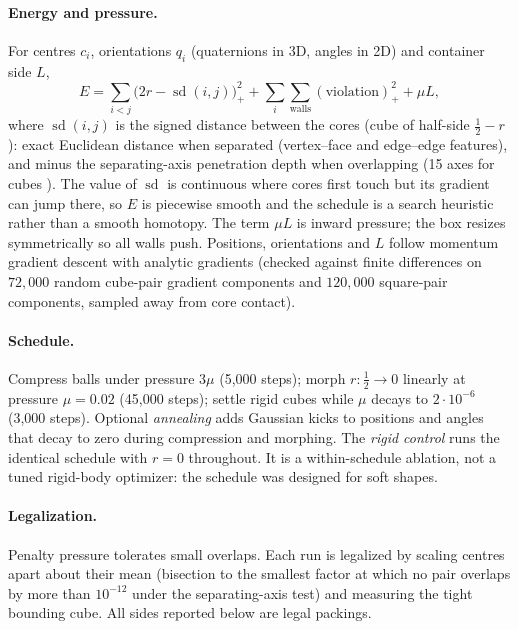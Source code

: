 \documentclass[11pt]{article}
\begin{document}
\paragraph{Energy and pressure.} For centres $c_i$, orientations $q_i$ (quaternions in 3D, angles in 2D) and container side $L$,
\[
E=\sum_{i<j}\big(2r-\operatorname{sd}(i,j)\big)_+^2+\sum_i\sum_{\text{walls}}(\text{violation})_+^2+\mu L,
\]
where $\operatorname{sd}(i,j)$ is the signed distance between the cores (cube of half-side $\tfrac12-r$): exact Euclidean distance when separated (vertex--face and edge--edge features), and minus the separating-axis penetration depth when overlapping (15 axes for cubes \cite{gottschalk}). The value of $\operatorname{sd}$ is continuous where cores first touch but its gradient can jump there, so $E$ is piecewise smooth and the schedule is a search heuristic rather than a smooth homotopy. The term $\mu L$ is inward pressure; the box resizes symmetrically so all walls push. Positions, orientations and $L$ follow momentum gradient descent with analytic gradients (checked against finite differences on $72{,}000$ random cube-pair gradient components and $120{,}000$ square-pair components, sampled away from core contact).

\paragraph{Schedule.} Compress balls under pressure $3\mu$ (5{,}000 steps); morph $r:\tfrac12\to0$ linearly at pressure $\mu=0.02$ (45{,}000 steps); settle rigid cubes while $\mu$ decays to $2\cdot10^{-6}$ (3{,}000 steps). Optional \emph{annealing} adds Gaussian kicks to positions and angles that decay to zero during compression and morphing. The \emph{rigid control} runs the identical schedule with $r=0$ throughout. It is a within-schedule ablation, not a tuned rigid-body optimizer: the schedule was designed for soft shapes.

\paragraph{Legalization.} Penalty pressure tolerates small overlaps. Each run is legalized by scaling centres apart about their mean (bisection to the smallest factor at which no pair overlaps by more than $10^{-12}$ under the separating-axis test) and measuring the tight bounding cube. All sides reported below are legal packings.
\end{document}
